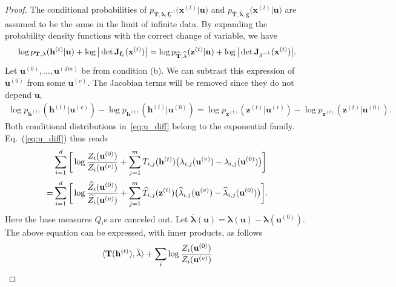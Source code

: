 \documentclass[twoside]{article}
\begin{document}
\begin{proof}
The conditional probabilities of $p_{\mathbf{T}, \mathbf{\lambda}, \mathbf{f}_t^{-1} }\big(\mathbf{x}^{(t)} | \mathbf{u}\big)$ and $p_{\widehat{\mathbf{T}}, \widehat{\mathbf{\lambda}}, \mathbf{g} }\big(\mathbf{x}^{(t)} | \mathbf{u}\big)$ are assumed to be the same in the limit of infinite data.  
By expanding the probability density functions with the correct change of variable, we have 
\begin{align} \notag
\log p_{\mathbf{T}, \mathbf{\lambda}}(\mathbf{h}^{(t)}| \mathbf{u}) + \log \big| \det \mathbf{J}_{\mathbf{f}_t}(\mathbf{x}^{(t)}) \big| = \log p_{\widehat{\mathbf{T}}, \widehat{\mathbf{\lambda}}}(\mathbf{z}^{(t)}| \mathbf{u}) + \log \big| \det \mathbf{J}_{g^{-1}}(\mathbf{x}^{(t)}) \big|.
\end{align}
Let $\mathbf{u}^{(0)},...,\mathbf{u}^{(dm)}$ be from condition (b). We can subtract this expression of $\mathbf{u}^{(0)}$ from some  $\mathbf{u}^{(v)}$. The Jacobian terms will be removed since they do not depend  $\mathbf{u}$,
\begin{align} \label{eq:u_diff}
\log p_{\mathbf{h}^{(t)}}(\mathbf{h}^{(t)}|\mathbf{u}^{(v)}) - \log p_{\mathbf{h}^{(t)}}(\mathbf{h}^{(t)}|\mathbf{u}^{(0)}) =\log p_{\mathbf{z}^{(t)}}(\mathbf{z}^{(t)}|\mathbf{u}^{(v)}) - \log p_{\mathbf{z}^{(t)}}(\mathbf{z}^{(t)}|\mathbf{u}^{(0)}) .
\end{align}
Both conditional distributions in~\eqref{eq:u_diff} belong to the exponential family. 
Eq.~(\ref{eq:u_diff}) thus reads
\begin{align} \notag
&\sum_{i=1}^d \bigg[\log \frac{Z_i(\mathbf{u}^{(0)})}{Z_i(\mathbf{u}^{(v)})} + \sum_{j=1}^m T_{i,j}(\mathbf{h}^{(t)})\big(\lambda_{i,j}(\mathbf{u}^{(v)})- \lambda_{i,j}(\mathbf{u}^{(0)})\big) \bigg] \\ \notag
= & \sum_{i=1}^d \bigg[\log \frac{\widehat{Z}_i(\mathbf{u}^{(0)})}{\widehat{Z}_i(\mathbf{u}^{(v)})} + \sum_{j=1}^m \widehat{T}_{i,j}(\mathbf{z}^{(t)})\big(\widehat{\lambda}_{i,j}(\mathbf{u}^{(v)})- \widehat{\lambda}_{i,j}(\mathbf{u}^{(0)})\big) \bigg].
\end{align}
Here the base measures $Q_i$s are canceled out. 
Let $\bar{\mathbf{\lambda}}(\mathbf{u}) = \mathbf{\lambda}(\mathbf{u})-\mathbf{\lambda}(\mathbf{u}^{(0)})$. 
The above equation can be expressed, with inner products, as follows
\begin{align} \notag
\langle \mathbf{T}(\mathbf{h}^{(t)}), \bar{\mathbf{\lambda}}	\rangle + \sum_i \log \frac{Z_i(\mathbf{u}^{(0)})}{Z_i(\mathbf{u}^{(v)})}

\end{align}
\end{proof}
\end{document}

